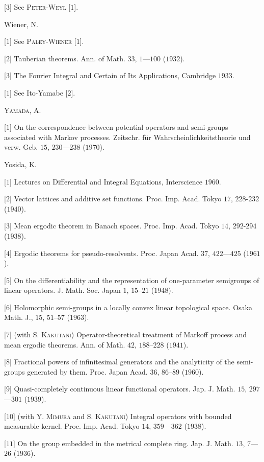 [$3$] See \textsc{Peter}-\textsc{Weyl} [$1$]. 

Wiener, N. 

[$1$] See \textsc{Paley}-\textsc{Wiener} [$1$]. 

[$2$] Tauberian theorems. Ann. of Math. $33$, $1$---$100$ ($1932$). 

[$3$] The Fourier Integral and Certain of Its Applications, Cambridge $1933$. 


[$1$] See Ito-Yamabe [$2$]. 

\textsc{Yamada}, A. 

[$1$] On the correspondence between potential operators and semi-groups associated with Markov processes. Zeitschr. für Wahrscheinlichkeitstheorie und verw. Geb. $15$, $230$---$238$ ($1970$). 

Yosida, K. 

[$1$] Lectures on Differential and Integral Equations, Interscience $1960$. 

[$2$] Vector lattices and additive set functions. Proc. Imp. Acad. Tokyo $17$, $228$-$232$ ($1940$). 

[$3$] Mean ergodic theorem in Banach spaces. Proc. Imp. Acad. Tokyo $14$, $292$-$294$ ($1938$). 

[$4$] Ergodic theorems for pseudo-resolvents. Proc. Japan Acad. $37$, $422$---$425$ ($1961$). 

[$5$] On the differentiability and the representation of one-parameter semigroups of linear operators. J. Math. Soc. Japan $1$, $15$--$21$ ($1948$). 

[$6$] Holomorphic semi-groups in a locally convex linear topological space. Osaka Math. J., $15$, $51$--$57$ ($1963$). 

[$7$] (with S. \textsc{Kakutani}) Operator-theoretical treatment of Markoff process and mean ergodic theorems. Ann. of Math. $42$, $188$--$228$ ($1941$). 

[$8$] Fractional powers of infinitesimal generators and the analyticity of the semi-groups generated by them. Proc. Japan Acad. $36$, $86$--$89$ ($1960$). 

[$9$] Quasi-completely continuous linear functional operators. Jap. J. Math. $15$, $297$---$301$ ($1939$). 

[$10$] (with Y. \textsc{Mimura} and S. \textsc{Kakutani}) Integral operators with bounded measurable kernel. Proc. Imp. Acad. Tokyo $14$, $359$---$362$ ($1938$). 

[$11$] On the group embedded in the metrical complete ring. Jap. J. Math. $13$, $7$---$26$ ($1936$). 

